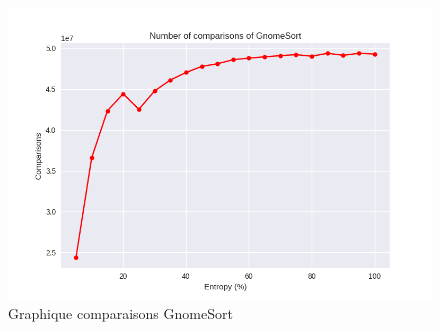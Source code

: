 \documentclass[10pt,a4paper]{article}
\begin{document}
            \begin{figure}
                \centering
                \includegraphics[width=1\textwidth]{graphique/GnomeSort/GraphComparisonsGnomeSort.png}
                \caption{Graphique comparaisons GnomeSort}
                \label{fig:mesh1}
            \end{figure}
\end{document}
